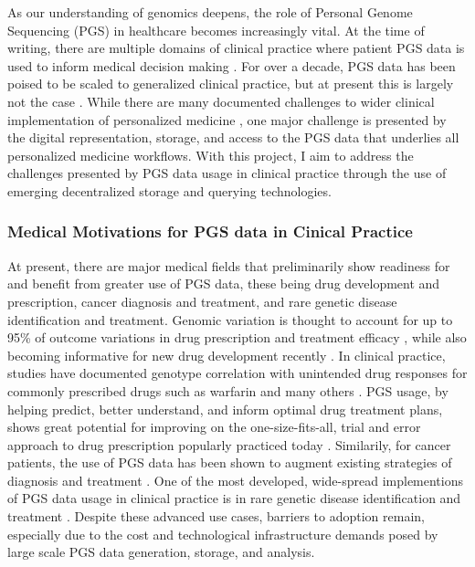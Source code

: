 \documentclass[runningheads]{llncs}
\begin{document}
As our understanding of genomics deepens, the role of Personal Genome Sequencing (PGS) in healthcare becomes increasingly vital. 
At the time of writing, there are multiple domains of clinical practice where patient PGS data is used to inform medical decision making \cite{souche_recommendations_2022, gil_analysis_2015}. 
For over a decade, PGS data has been poised to be scaled to generalized clinical practice, but at present this is largely not the case \cite{alzubi_personal_2014}. 
While there are many documented challenges to wider clinical implementation of personalized medicine \cite{stefanicka-wojtas_barriers_2023}, one major challenge is presented by the digital representation, storage, and access to the PGS data that underlies all personalized medicine workflows.
With this project, I aim to address the challenges presented by PGS data usage in clinical practice through the use of emerging decentralized storage and querying technologies.  


\subsubsection{Medical Motivations for PGS data in Cinical Practice}
At present, there are major medical fields that preliminarily show readiness for and benefit from greater use of PGS data, these being drug development and prescription, cancer diagnosis and treatment, and rare genetic disease identification and treatment.
Genomic variation is thought to account for up to 95\% of outcome variations in drug prescription and treatment efficacy \cite{belle_genetic_2008}, while also becoming informative for new drug development recently \cite{ko_new_2022}. 
In clinical practice, studies have documented genotype correlation with unintended drug responses for commonly prescribed drugs such as warfarin \cite{linder_genetic_2001} and many others \cite{research_table_2024}. 
PGS usage, by helping predict, better understand, and inform optimal drug treatment plans, shows great potential for improving on the one-size-fits-all, trial and error approach to drug prescription popularly practiced today \cite{hens_return_2011}. 
Similarily, for cancer patients, the use of PGS data has been shown to augment existing strategies of diagnosis and treatment \cite{mcleod_cancer_2013}. 
One of the most developed, wide-spread implementions of PGS data usage in clinical practice is in rare genetic disease identification and treatment \cite{krier_genomic_2016}. 
Despite these advanced use cases, barriers to adoption remain, especially due to the cost and technological infrastructure demands posed by large scale PGS data generation, storage, and analysis.
\end{document}
